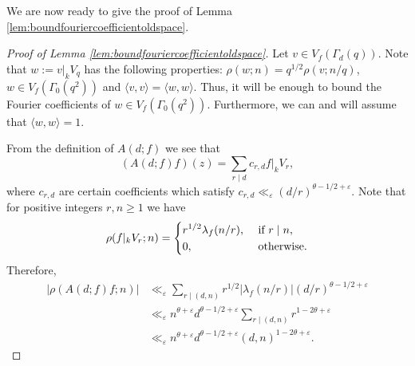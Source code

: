 \documentclass{article}
\theoremstyle{named}
\begin{document}
We are now ready to give the proof of Lemma \ref{lem:boundfouriercoefficientoldspace}.
\begin{proof}[Proof of Lemma \ref{lem:boundfouriercoefficientoldspace}]
Let $v \in V_f(\Gamma_d(q))$. Note that $w := v|_k V_q$ has the following properties: $\rho(w; n) = q^{1/2}\rho(v; n/q)$, $w \in V_f(\Gamma_0(q^2))$ and $\langle v, v\rangle = \langle w, w \rangle$. Thus, it will be enough to bound the Fourier coefficients of $w \in V_f(\Gamma_0(q^2))$. Furthermore, we can and will assume that $\langle w, w\rangle = 1$. 

From the definition of $A(d; f)$ we see that 
\begin{equation*}
    (A(d; f)f)(z) = \sum_{r \mid d} c_{r, d} f|_k V_r, 
\end{equation*}
where $c_{r, d}$ are certain coefficients which satisfy $c_{r, d} \ll_\varepsilon (d/r)^{\theta -1/2 + \varepsilon}$. Note that for positive integers $r, n \geq 1$ we have
\begin{equation*}
\rho(f|_k V_r; n) = \begin{dcases}
    r^{1/2}\lambda_f(n/r), & \text{ if }r \mid n,\\
    0, & \text{ otherwise}.
\end{dcases}
\end{equation*}
Therefore,
\begin{equation}\label{eq:auxiliaryestimatefouriercoefficent}
\begin{aligned}
    |\rho(A(d; f)f; n)| & \ll_\varepsilon \sum_{r \mid (d, n)}  r^{1/2}|\lambda_f(n/r)|(d/r)^{\theta -1/2 + \varepsilon}\\
    & \ll_\varepsilon n^{\theta + \varepsilon}d^{\theta - 1/2 + \varepsilon}\sum_{r \mid (d, n)}r^{1 -2\theta + \varepsilon}\\
    & \ll_\varepsilon  n^{\theta + \varepsilon}d^{\theta - 1/2 + \varepsilon} (d, n)^{1 - 2\theta + \varepsilon}.
\end{aligned}
\end{equation}


\end{proof}
\end{document}
